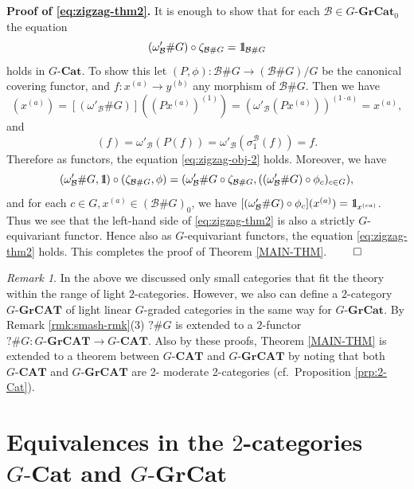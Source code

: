 \documentclass{surv-l}
\makeatletter
\DeclareRobustCommand{\forcelinebreak}{%
    \@ifstar{\unskip\\\ignorespaces}{\unskip\linebreak}%
}
\numberwithin{equation}{chapter}
\numberwithin{figure}{chapter}
\theoremstyle{plain}
\theoremstyle{definition}
\theoremstyle{remark}
\newtheorem{rmk}[thm]{Remark}
\newcommand{\id}{1\kern-.25em{\text{{\rm l}}}}
\newcommand{\GCat}{G\text{-}\mathbf{Cat}}
\newcommand{\GGrCat}{G\text{-}\mathbf{GrCat}}
\newcommand{\GCAT}{G\text{-}\mathbf{CAT}}
\newcommand{\GGrCAT}{G\text{-}\mathbf{GrCAT}}
\makeatother
\begin{document}
{\bf Proof of \eqref{eq:zigzag-thm2}.}
It is enough to show that for each $\mathcal{B} \in \GGrCat_0$
the equation
\begin{equation}\label{eq:zigzag-obj-2}
(\omega'_\mathcal{B} \# G) \circ \zeta_{\mathcal{B}\#G} = \id_{\mathcal{B}\# G}
\end{equation}
holds in $\GCat$.
To show this let
$(P,  \phi) \colon \mathcal{B} \# G \to (\mathcal{B}\# G)/G$ be the canonical covering functor,
and $f \colon x^{(a)} \to y^{(b)}$ any morphism of $\mathcal{B}\# G$.
Then we have
\begin{equation*}
[(\omega'_\mathcal{B} \# G) \circ \zeta_{\mathcal{B}\#G}](x^{(a)})
= [(\omega'_\mathcal{B} \# G)]((Px^{(a)})^{(1)}) = (\omega'_\mathcal{B}(Px^{(a)}))^{(1\cdot a)} = x^{(a)},
\end{equation*}
and
\begin{equation*}
[(\omega'_\mathcal{B} \# G) \circ \zeta_{\mathcal{B}\#G}](f)
= \omega'_\mathcal{B}(P(f)) = \omega'_\mathcal{B}(\sigma_1^\mathcal{B}(f)) = f.
\end{equation*}
Therefore as functors, the equation \eqref{eq:zigzag-obj-2} holds.
Moreover, we have
\[
(\omega'_\mathcal{B}\# G, \id) \circ (\zeta_{\mathcal{B}\# G}, \phi) =
(\omega'_\mathcal{B}\# G \circ \zeta_{\mathcal{B}\# G}, ((\omega'_{\mathcal{B}}\#G)\circ\phi_c)_{c \in G}),
\]
and for each $c \in G, x^{(a)} \in (\mathcal{B}\# G)_0$, we have
$[(\omega'_{\mathcal{B}}\#G)\circ\phi_c](x^{(a)}) = \id_{x^{(ca)}}$.
Thus we see that the left-hand side of \eqref{eq:zigzag-thm2} is
also a strictly $G$-equivariant functor.
Hence also as $G$-equivariant functors,
the equation \eqref{eq:zigzag-thm2} holds.
This completes the proof of Theorem \ref{MAIN-THM}. \quad \hfill $\qed$

\begin{rmk}\label{rmk:main-thm-GCAT}\label{rem:5.8.15}
In the above we discussed only small categories
that fit the theory within the range of light $2$-categories.
However, we also can define a $2$-category $\GGrCAT$ of
light linear $G$-graded categories in the same way for\forcelinebreak $\GGrCat$.
By Remark \ref{rmk:smash-rmk}(3) $?\# G$ is extended to
a $2$-functor $?\# G \colon \GGrCAT \to \GCAT$.
Also by these proofs, Theorem \ref{MAIN-THM} is extended to
a theorem between $\GCAT$ and $\GGrCAT$ by noting that
both $\GCAT$ and $\GGrCAT$ are 2-\forcelinebreak{}moderate 2-categories
(cf.\ Proposition \ref{prp:2-Cat}).
\end{rmk}

\section{Equivalences in the $2$-categories $\GCat$ and $\GGrCat$}
\end{document}

